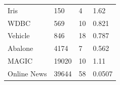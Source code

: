 \begin{tabular}{llll}
Iris & 150 & 4 & 1.62 \\
WDBC & 569 & 10 & 0.821 \\
Vehicle & 846 & 18 & 0.787 \\
Abalone & 4174 & 7 & 0.562 \\
MAGIC & 19020 & 10 & 1.11 \\
Online News & 39644 & 58 & 0.0507 \\
\end{tabular}
